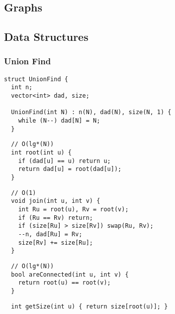 \documentclass[twoside]{article}
\begin{document}
\selectfont
\begin{multicols*}{2}
	\tableofcontents
	\newpage
\sectionfont{\bfseries\sffamily\centering\Huge}
\vspace{1em}
\section*{Graphs}
\vspace{3em}
\subsectionfont{\bfseries\sffamily\centering\LARGE}
\vspace{0em}
\subsection*{Data Structures}
\vspace{2em}
\subsubsectionfont{\large\bfseries\sffamily\underline}
\subsubsection*{Union Find}
\begin{verbatim}
struct UnionFind {
  int n;
  vector<int> dad, size;

  UnionFind(int N) : n(N), dad(N), size(N, 1) {
    while (N--) dad[N] = N;
  }
\end{verbatim}
\vspace{-12pt}
\begin{verbatim}
  // O(lg*(N))
  int root(int u) {
    if (dad[u] == u) return u;
    return dad[u] = root(dad[u]);
  }
\end{verbatim}
\vspace{-12pt}
\begin{verbatim}
  // O(1)
  void join(int u, int v) {
    int Ru = root(u), Rv = root(v);
    if (Ru == Rv) return;
    if (size[Ru] > size[Rv]) swap(Ru, Rv);
    --n, dad[Ru] = Rv;
    size[Rv] += size[Ru];
  }
\end{verbatim}
\vspace{-12pt}
\begin{verbatim}
  // O(lg*(N))
  bool areConnected(int u, int v) {
    return root(u) == root(v);
  }
\end{verbatim}
\vspace{-12pt}
\begin{verbatim}
  int getSize(int u) { return size[root(u)]; }


\end{verbatim}
\end{multicols*}
\end{document}
